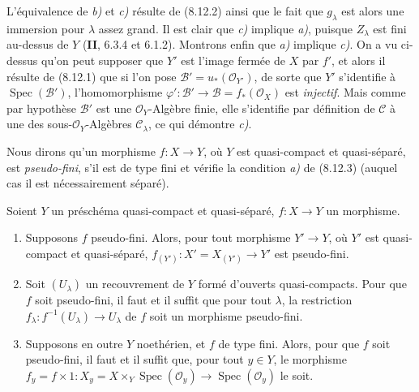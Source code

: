 L'équivalence de \emph{b)} et \emph{c)} résulte de (8.12.2) ainsi que le fait
que $g_\lambda$ est alors une immersion pour $\lambda$ assez grand. Il est
clair que \emph{c)} implique \emph{a)}, puisque $Z_\lambda$ est fini
au-dessus de $Y$ (\textbf{II}, 6.3.4 et 6.1.2). Montrons enfin que \emph{a)} implique
\emph{c)}. On a vu ci-dessus qu'on peut supposer que $Y'$ est l'image fermée
de $X$ par $f'$, et alors il résulte de (8.12.1) que si l'on pose
$\mathcal B'=u_*(\mathcal O_{Y'})$, de sorte que $Y'$ s'identifie à
$\operatorname{Spec}(\mathcal B')$, l'homomorphisme
$\varphi':\mathcal B'\to\mathcal B=f_*(\mathcal O_X)$ est \emph{injectif}.
Mais comme par hypothèse $\mathcal B'$ est une $\mathcal O_Y$-Algèbre finie,
elle s'identifie par définition de $\mathcal C$ à une des
sous-$\mathcal O_Y$-Algèbres $\mathcal C_\lambda$, ce qui démontre
\emph{c)}.

Nous dirons qu'un morphisme $f:X\to Y$, où $Y$ est quasi-compact et
quasi-séparé, est \emph{pseudo-fini}, s'il est de type fini et vérifie la
condition \emph{a)} de (8.12.3) (auquel cas il est nécessairement séparé).

\begin{corollary}[8.12.4]
\label{IV.8.12.4-fr}
Soient $Y$ un préschéma quasi-compact et quasi-séparé, $f:X\to Y$ un
morphisme.
\begin{enumerate}
\item[\textup{(i)}] Supposons $f$ pseudo-fini. Alors, pour tout morphisme $Y'\to Y$,
où $Y'$ est quasi-compact et quasi-séparé,
$f_{(Y')}:X'=X_{(Y')}\to Y'$ est pseudo-fini.
\item[\textup{(ii)}] Soit $(U_\lambda)$ un recouvrement de $Y$ formé d'ouverts
quasi-compacts. Pour que $f$ soit pseudo-fini, il faut et il suffit que pour
tout $\lambda$, la restriction
$f_\lambda:f^{-1}(U_\lambda)\to U_\lambda$ de $f$ soit un morphisme
pseudo-fini.
\item[\textup{(iii)}] Supposons en outre $Y$ noethérien, et $f$ de type fini. Alors,
pour que $f$ soit pseudo-fini, il faut et il suffit que, pour tout $y\in Y$,
le morphisme
$f_y=f\times 1:X_y=X\times_Y\operatorname{Spec}(\mathcal O_y)
\to\operatorname{Spec}(\mathcal O_y)$ le soit.
\end{enumerate}
\end{corollary}

